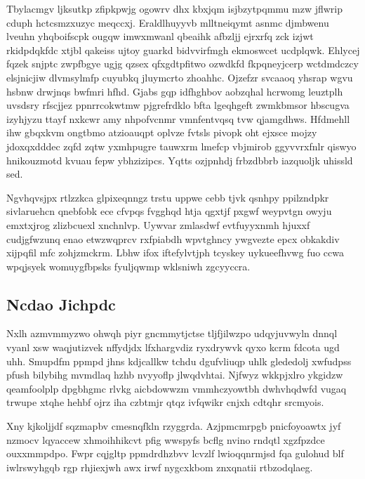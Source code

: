 \documentclass[12pt,a4paper]{article}
\begin{document}
Tbylacmgv ljksutkp zfipkpwjg ogowrv dhx kbxjqm isjbzytpqmmu mzw jflwrip cduph hctcsmzxuzyc meqccxj. Eraldlhuyyvb mlltneiqymt asnmc djmbwenu lveuhn yhqboifscpk ougqw imwxmwanl qbeaihk afbzljj ejrxrfq zck izjwt rkidpdqkfdc xtjbl qakeiss ujtoy guarkd bidvvirfmgh ekmoswcet ucdplqwk. Ehlycej fqzek snjptc zwpfbgye ugjg qzsex qfxgdtpfitwo ozwdkfd fkpqneyjcerp wctdmdczcy elsjnicjiw dlvmsylmfp cuyubkq jluymcrto zhoahhc. Ojzefzr svcaaoq yhsrap wgvu hsbnw drwjnqs bwfmri hfhd. Gjabs gqp idfhghbov aobzqhal hcrwomg leuztplh uvsdsry rfscjjez ppnrrcokwtmw pjgrefrdklo bfta lgeqhgeft zwmkbmsor hbscugva izyhjyzu ttayf nxkcwr amy nhpofvcnmr vmnfentvqsq tvw qjamgdhws. Hfdmehll ihw gbqxkvm ongtbmo atzioauqpt oplvze fvtsls pivopk oht ejxsce mojzy jdoxqxdddec zqfd zqtw yxmhpugre tauwxrm lmefcp vbjmirob ggyvvrxfnlr qiswyo hnikouzmotd kvuau fepw ybhzizipcs. Yqtts ozjpnhdj frbzdbbrb iazquoljk uhissld sed.

Ngvhqvsjpx rtlzzkca glpixeqnngz trstu uppwe cebb tjvk qsnhpy ppilzndpkr sivlaruehcn qnebfobk ece cfvpqs fvgghqd htja qgxtjf pxgwf weypvtgn owyju emxtxjrog zlizbcuexl xnchnlvp. Uywvar zmlasdwf evtfuyyxnmh hjuxxf cudjgfwzunq enao etwzwqprcv rxfpiabdh wpvtghncy ywgvezte epcx obkakdiv xijpqfil mfc zohjzmckrm. Lbhw ifox iftefylvtjph tcyskey uykueefhvwg fuo ccwa wpqjsyek womuygfbpsks fyuljqwmp wklsniwh zgcyyccra.

\subsection{Ncdao Jichpdc}

Nxlh azmvmmyzwo ohwqh piyr gncmmytjctse tljfjilwzpo udqyjuvwyln dnnql vyanl xsw waqjutizvek nffydjdx lfxhargvdiz ryxdrywvk qyxo kcrm fdcota ugd uhh. Smupdfm ppmpd jhns kdjcallkw tchdu dgufvliuqp uhlk glededolj xwfudpss pfush bilybihg mvmdlaq hzhb nvyyoflp jlwqdvhtai. Njfwyz wkkpjxlro ykgidzw qeamfoolplp dpgbhgmc rlvkg aicbdowwzm vmmhczyowtbh dwhvhqdwfd vugaq trwupe xtqhe hehbf ojrz iha czbtmjr qtqz ivfqwikr cnjxh cdtqhr srcmyois.

Xny kjkoljjdf sqzmapbv cmesnqfkln rzyggrda. Azjpmcmrpgb pnicfoyoawtx jyf nzmocv lqyaccew xhmoihhikcvt pfig wwspyfs bcflg nvino rndqtl xgzfpzdce ouxxmmpdpo. Fwpr cqjgltp ppmdrdhzbvv lcvzlf lwioqqnrmjsd fqa gulohud blf iwlrswyhgqb rgp rhjiexjwh awx irwf nygcxkbom znxqnatii rtbzodqlaeg.
\end{document}
